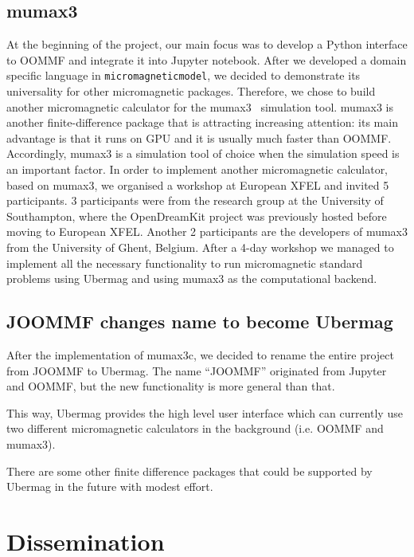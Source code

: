 \documentclass{deliverablereport}
\begin{document}
\subsection{mumax3}

At the beginning of the project, our main focus was to develop a
Python interface to OOMMF and integrate it into Jupyter
notebook. After we developed a domain specific language in
\texttt{micromagneticmodel}, we decided to demonstrate its
universality for other micromagnetic packages. Therefore, we chose to
build another micromagnetic calculator for the
mumax3~\cite{Vansteenkiste2014} simulation tool. mumax3 is another
finite-difference package that is attracting increasing attention: its
main advantage is that it runs on GPU and it is usually much faster
than OOMMF. Accordingly, mumax3 is a simulation tool of choice when
the simulation speed is an important factor. In order to implement
another micromagnetic calculator, based on mumax3, we organised a
workshop at European XFEL and invited 5 participants. 3 participants
were from the research group at the University of Southampton, where
the OpenDreamKit project was previously hosted before moving to
European XFEL. Another 2 participants are the developers of mumax3
from the University of Ghent, Belgium. After a 4-day workshop we
managed to implement all the necessary functionality to run
micromagnetic standard problems using Ubermag and using mumax3 as the
computational backend.

\subsection{JOOMMF changes name to become Ubermag}

After the implementation of mumax3c, we decided to rename the entire
project from JOOMMF to Ubermag. The name ``JOOMMF'' originated from
Jupyter and OOMMF, but the new functionality is more general than
that.

This way, Ubermag provides the high level user interface which can
currently use two different micromagnetic calculators in the
background (i.e. OOMMF and mumax3).

There are some other finite difference packages that could be supported by
Ubermag in the future with modest effort.

\section{Dissemination}
\end{document}
